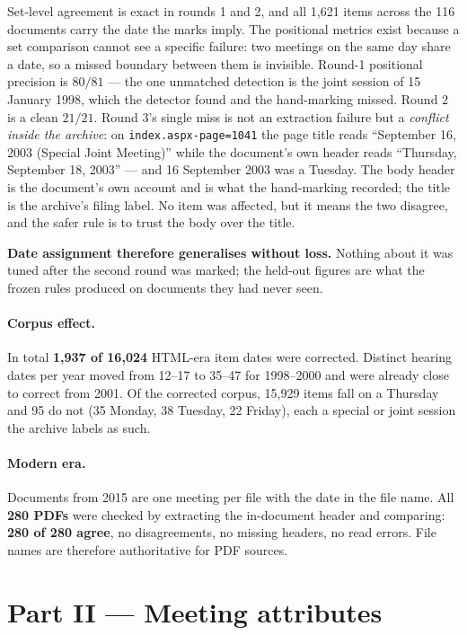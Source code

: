 \documentclass[11pt]{article}
\begin{document}
Set-level agreement is exact in rounds 1 and 2, and all 1{,}621 items across the 116
documents carry the date the marks imply. The positional metrics exist because a set comparison
cannot see a specific failure: two meetings on the same day share a date, so a missed
boundary between them is invisible. Round-1 positional precision is $80/81$ --- the one unmatched detection is the joint session
of 15 January 1998, which the detector found and the hand-marking missed. Round 2 is a clean
$21/21$. Round 3's single miss is not an extraction failure but a \emph{conflict inside the
archive}: on \texttt{index.aspx-page=1041} the page title reads ``September 16, 2003 (Special
Joint Meeting)'' while the document's own header reads ``Thursday, September 18, 2003'' ---
and 16 September 2003 was a Tuesday. The body header is the document's own account and is
what the hand-marking recorded; the title is the archive's filing label. No item was
affected, but it means the two disagree, and the safer rule is to trust the body over the
title.

\textbf{Date assignment therefore generalises without loss.} Nothing about it was tuned
after the second round was marked; the held-out figures are what the frozen rules produced
on documents they had never seen.

\paragraph{Corpus effect.} In total \textbf{1{,}937 of 16{,}024} HTML-era item dates were
corrected. Distinct hearing dates per year moved from 12--17 to 35--47 for 1998--2000 and
were already close to correct from 2001. Of the corrected corpus, 15{,}929 items fall on a
Thursday and 95 do not (35 Monday, 38 Tuesday, 22 Friday), each a special or joint session
the archive labels as such.

\paragraph{Modern era.} Documents from 2015 are one meeting per file with the date in the
file name. All \textbf{280 PDFs} were checked by extracting the in-document header and
comparing: \textbf{280 of 280 agree}, no disagreements, no missing headers, no read errors.
File names are therefore authoritative for PDF sources.

\section{Part II --- Meeting attributes}
\end{document}
